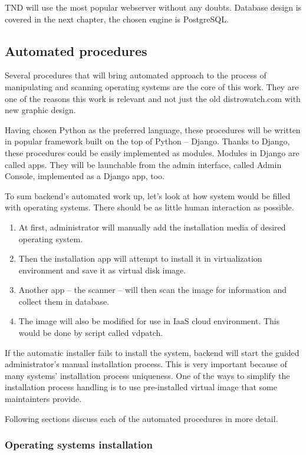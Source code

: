 \documentclass[thesis=B,english]{FITthesis}[2013/04/26]
\begin{document}
TND will use the most popular webserver without any doubts. Database design is covered in the next chapter, the chosen engine is PostgreSQL.

\subsection{Automated procedures}

Several procedures that will bring automated approach to the process of manipulating and scanning operating systems are the core of this work. They are one of the reasons this work is relevant and not just the old distrowatch.com with new graphic design.

Having chosen Python as the preferred language, these procedures will be written in popular framework built on the top of Python -- Django. Thanks to Django, these procedures could be easily implemented as modules. Modules in Django are called apps. They will be launchable from the admin interface, called Admin Console, implemented as a Django app, too.

To sum backend's automated work up, let's look at how system would be filled with operating systems. There should be as little human interaction as possible. 

\begin{enumerate}
	\item At first, administrator will manually add the installation media of desired operating system.
	\item Then the installation app will attempt to install it in virtualization environment and save it as virtual disk image.
	\item Another app -- the scanner -- will then scan the image for information and collect them in database.
	\item The image will also be modified for use in IaaS cloud environment. This would be done by script called vdpatch.
\end{enumerate}

If the automatic installer fails to install the system, backend will start the guided administrator's manual installation process. This is very important because of many systems' installation process uniqueness. One of the ways to simplify the installation process handling is to use pre-installed virtual image that some maintainters provide.

Following sections discuss each of the automated procedures in more detail.

\subsubsection{Operating systems installation}
\end{document}
